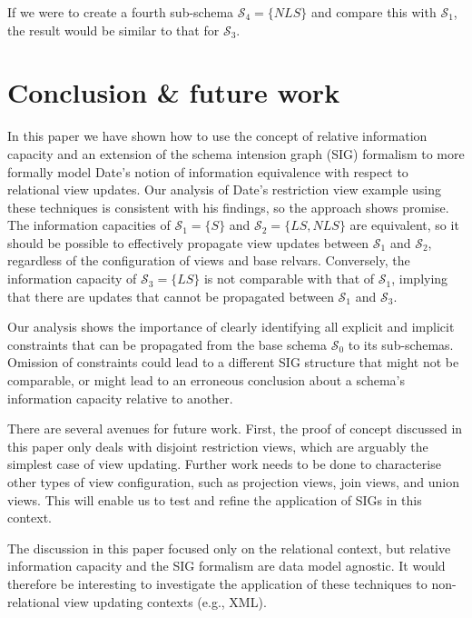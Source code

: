 \documentclass{sig-alternate-05-2015}
\newcounter{constraint}
\newcommand{\LS}{\ensuremath{\mathit{LS}}}
\newcommand{\NLS}{\ensuremath{\mathit{NLS}}}
\newcommand{\SC}[1]{\ensuremath{\mathcal{S}_{#1}}}
\begin{document}
If we were to create a fourth sub-schema \(\SC{4} = \{\NLS\}\) and compare this with \(\SC{1}\), the result would be similar to that for \(\SC{3}\).




\section{Conclusion \& future work}
\label{sec-conclusion}

\noindent In this paper we have shown how to use the concept of relative information capacity and an extension of the schema intension graph (SIG) formalism to more formally model Date's notion of information equivalence with respect to relational view updates. Our analysis of Date's restriction view example \cite{Date.C-2013a-View} using these techniques is consistent with his findings, so the approach shows promise. The information capacities of \(\SC{1} = \{S\}\) and \(\SC{2} = \{\LS,\NLS\}\) are equivalent, so it should be possible to effectively propagate view updates between \(\SC{1}\) and \(\SC{2}\), regardless of the configuration of views and base relvars. Conversely, the information capacity of \(\SC{3} = \{\LS\}\) is not comparable with that of \(\SC{1}\), implying that there are updates that cannot be propagated between \(\SC{1}\) and \(\SC{3}\).

Our analysis shows the importance of clearly identifying all explicit and implicit constraints that can be propagated from the base schema \(\SC{0}\) to its sub-schemas. Omission of constraints could lead to a different SIG structure that might not be comparable, or might lead to an erroneous conclusion about a schema's information capacity relative to another.

There are several avenues for future work. First, the proof of concept discussed in this paper only deals with disjoint restriction views, which are arguably the simplest case of view updating. Further work needs to be done to characterise other types of view configuration, such as projection views, join views, and union views. This will enable us to test and refine the application of SIGs in this context.

The discussion in this paper focused only on the relational context, but relative information capacity and the SIG formalism are data model agnostic. It would therefore be interesting to investigate the application of these techniques to non-relational view updating contexts (e.g., XML).
\end{document}
